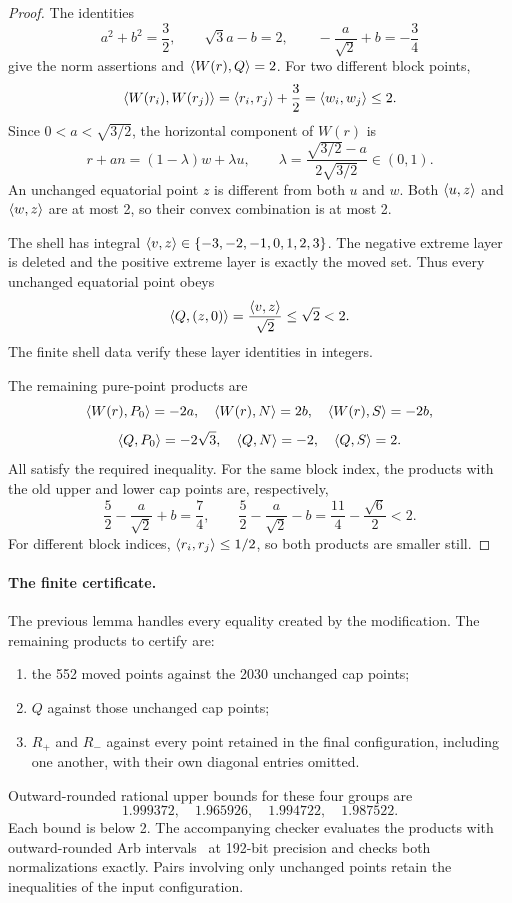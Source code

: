 \begin{proof}
The identities
\[
a^2+b^2=\frac32,\qquad \sqrt3a-b=2,\qquad
-\frac a{\sqrt2}+b=-\frac34
\]
give the norm assertions and $\langle W(r),Q\rangle=2$.
For two different block points,
\[
\langle W(r_i),W(r_j)\rangle=\langle r_i,r_j\rangle+\frac32=\langle w_i,w_j\rangle\le2.
\]
Since $0<a<\sqrt{3/2}$, the horizontal component of $W(r)$ is
\[
r+a n=(1-\lambda)w+\lambda u,\qquad
\lambda=\frac{\sqrt{3/2}-a}{2\sqrt{3/2}}\in(0,1).
\]
An unchanged equatorial point $z$ is different from both $u$ and $w$.
Both $\langle u,z\rangle$ and $\langle w,z\rangle$ are at most 2, so their convex combination is
at most 2.

The shell has integral $\langle v,z\rangle\in\{-3,-2,-1,0,1,2,3\}$.
The negative extreme layer is deleted and the positive extreme layer
is exactly the moved set. Thus every unchanged equatorial point obeys
\[
 \langle Q,(z,0)\rangle=\frac{\langle v,z\rangle}{\sqrt2}\le\sqrt2<2.
\]
The finite shell data verify these layer identities in integers.

The remaining pure-point products are
\[
\langle W(r),P_0\rangle=-2a,\quad
\langle W(r),N\rangle=2b,\quad \langle W(r),S\rangle=-2b,
\]
\[
\langle Q,P_0\rangle=-2\sqrt3,\quad \langle Q,N\rangle=-2,\quad \langle Q,S\rangle=2.
\]
All satisfy the required inequality. For the same block index, the
products with the old upper and lower cap points are, respectively,
\[
\frac52-\frac a{\sqrt2}+b=\frac74,
\qquad
\frac52-\frac a{\sqrt2}-b=\frac{11}{4}-\frac{\sqrt6}{2}<2.
\]
For different block indices, $\langle r_i,r_j\rangle\le1/2$, so both products
are smaller still.
\end{proof}

\paragraph{The finite certificate.}
The previous lemma handles every equality created by the modification.
The remaining products to certify are:
\begin{enumerate}
\item the 552 moved points against the 2030 unchanged cap points;
\item $Q$ against those unchanged cap points;
\item $R_+$ and $R_-$ against every point retained in the final configuration,
      including one another, with their own diagonal entries omitted.
\end{enumerate}
Outward-rounded rational upper bounds for these four groups are
\[
1.999372,\quad 1.965926,\quad 1.994722,\quad 1.987522.
\]
Each bound is below 2. The accompanying checker evaluates the products
with outward-rounded Arb intervals~\cite{johansson-arb} at 192-bit precision and checks both
normalizations exactly. Pairs involving only unchanged points retain the
inequalities of the input configuration.

